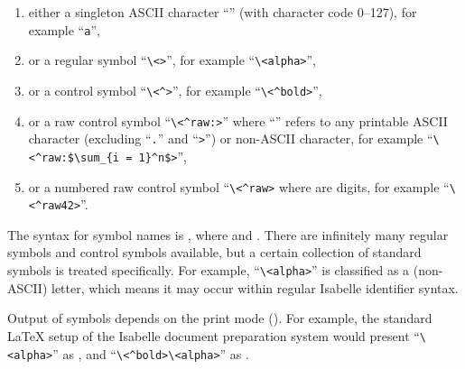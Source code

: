 \begin{isabellebody}
\begin{isamarkuptext}
  \begin{enumerate}

  \item either a singleton ASCII character ``'' (with
  character code 0--127), for example ``\verb,a,'',

  \item or a regular symbol ``\verb,\,\verb,<,\verb,>,'', for example ``\verb,\,\verb,<alpha>,'',

  \item or a control symbol ``\verb,\,\verb,<^,\verb,>,'', for example ``\verb,\,\verb,<^bold>,'',

  \item or a raw control symbol ``\verb,\,\verb,<^raw:,\isa{{\isasymdots}}\verb,>,'' where ``\isa{{\isasymdots}}'' refers to any printable ASCII
  character (excluding ``\verb,.,'' and ``\verb,>,'') or non-ASCII
  character, for example ``\verb,\,\verb,<^raw:$\sum_{i = 1}^n$>,'',

  \item or a numbered raw control symbol ``\verb,\,\verb,<^raw,\verb,>, where  are digits, for example
  ``\verb,\,\verb,<^raw42>,''.

  \end{enumerate}

  The  syntax for symbol names is , where  and
  .  There are infinitely many regular symbols
  and control symbols available, but a certain collection of standard
  symbols is treated specifically.  For example,
  ``\verb,\,\verb,<alpha>,'' is classified as a (non-ASCII) letter,
  which means it may occur within regular Isabelle identifier syntax.

  Output of symbols depends on the print mode
  ().  For example, the standard {\LaTeX} setup
  of the Isabelle document preparation system would present
  ``\verb,\,\verb,<alpha>,'' as \isa{{\isasymalpha}}, and
  ``\verb,\,\verb,<^bold>,\verb,\,\verb,<alpha>,'' as \isa{\isactrlbold {\isasymalpha}}.


\end{isamarkuptext}
\end{isabellebody}
